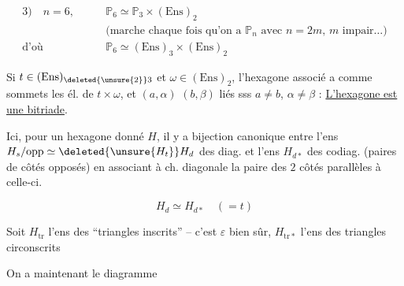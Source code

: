 
\[
\begin{aligned}
3)\quad n=6,\qquad &\mathbb P_6\simeq\mathbb P_3\times(\mathrm{Ens})_2\\
&\text{(marche chaque fois qu'on a $\mathbb P_n$ avec $n=2m$, $m$ impair\ldots)}\\
\text{d'où}\qquad &\mathbb P_6\simeq(\mathrm{Ens})_3\times(\mathrm{Ens})_2
\end{aligned}
\]

Si $t\in(\mathrm{Ens})_{\deleted{\unsure{2}}3}$ et $\omega\in(\mathrm{Ens})_2$,  l'hexagone associé a comme sommets les él. de $t\times\omega$, et $(a,\alpha)$ $(b,\beta)$  liés sss $a\ne b$, $\alpha\ne\beta$ : \uline{L'hexagone est une bitriade}.

Ici, pour un hexagone donné $H$,  il y a bijection canonique entre l'ens $H_s/\mathrm{opp}\simeq\deleted{\unsure{H_t}}H_d$ des diag. et l'ens $H_{d*}$ des  codiag. (paires de côtés opposés) en associant à ch. diagonale la paire des $2$ côtés parallèles à celle-ci.

\[\boxed{H_d\simeq H_{d*}}\quad(=t)\]

Soit $H_{\mathrm{tr}}$ l'ens des  ``triangles inscrits'' -- c'est $\varepsilon$\deleted{\unsure{\xi}} bien sûr,  $H_{\mathrm{tr}*}$ l'ens des triangles circonscrits

On a maintenant le diagramme




